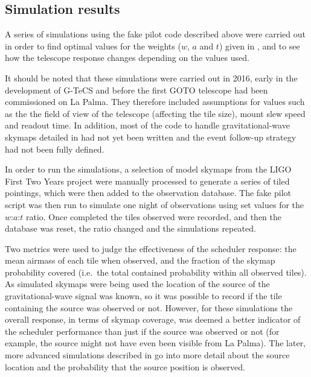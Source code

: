 \subsection{Simulation results}
\label{sec:scheduler_sim_results}
\begin{colsection}

A series of simulations using the fake pilot code described above were carried out in order to find optimal values for the weights ($w$, $a$ and $t$) given in , and to see how the telescope response changes depending on the values used.

It should be noted that these simulations were carried out in 2016, early in the development of G-TeCS and before the first GOTO telescope had been commissioned on La Palma. They therefore included assumptions for values such as the the field of view of the telescope (affecting the tile size), mount slew speed and readout time. In addition, most of the code to handle gravitational-wave skymaps detailed in  had not yet been written and the event follow-up strategy had not been fully defined.

In order to run the simulations, a selection of model skymaps from the LIGO First Two Years project \citep{First2Years} were manually processed to generate a series of tiled pointings, which were then added to the observation database. The fake pilot script was then run to simulate one night of observations using set values for the $w$:$a$:$t$ ratio. Once completed the tiles observed were recorded, and then the database was reset, the ratio changed and the simulations repeated.

Two metrics were used to judge the effectiveness of the scheduler response: the mean airmass of each tile when observed, and the fraction of the skymap probability covered (i.e.\ the total contained probability within all observed tiles). As simulated skymaps were being used the location of the source of the gravitational-wave signal was known, so it was possible to record if the tile containing the source was observed or not. However, for these simulations the overall response, in terms of skymap coverage, was deemed a better indicator of the scheduler performance than just if the source was observed or not (for example, the source might not have even been visible from La Palma). The later, more advanced simulations described in  go into more detail about the source location and the probability that the source position is observed.

\newpage

\end{colsection}

